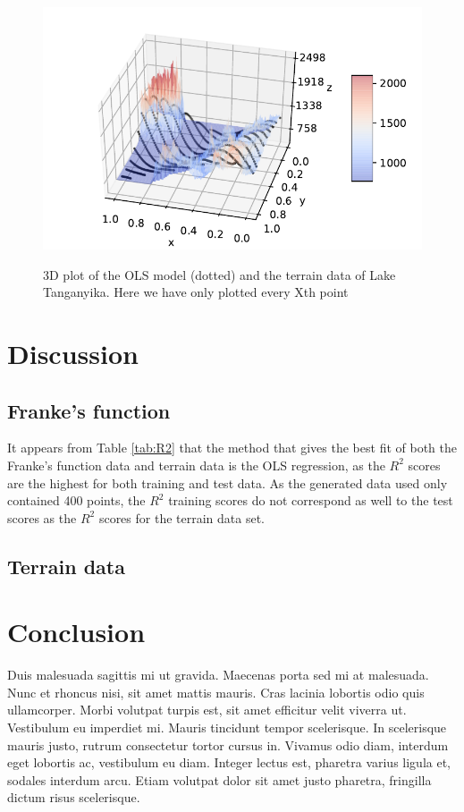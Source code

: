 \documentclass[a4paper, 10pt]{article}
\begin{document}
\begin{figure}[H]
	\includegraphics[scale=1]{figs/3dmodel_OLS_terrain.pdf}
	\label{fig:3d_OLS_terrain}
	\caption{3D plot of the OLS model (dotted) and the terrain data of Lake Tanganyika. Here we have only plotted every Xth point }
\end{figure}


\begin{multicols}{2}


\section{Discussion}
\subsection{Franke's function}
It appears from Table \ref{tab:R2} that the method that gives the best fit of both the Franke's function data and terrain data is the OLS regression, as the $R^2$ scores are the highest for both training and test data. As the generated data used only contained 400 points, the $R^2$ training scores do not correspond as well to the test scores as the $R^2$ scores for  the terrain data set. 

\subsection{Terrain data}

\section{Conclusion}
Duis malesuada sagittis mi ut gravida. Maecenas porta sed mi at malesuada. Nunc et rhoncus nisi, sit amet mattis mauris. Cras lacinia lobortis odio quis ullamcorper. Morbi volutpat turpis est, sit amet efficitur velit viverra ut. Vestibulum eu imperdiet mi. Mauris tincidunt tempor scelerisque. In scelerisque mauris justo, rutrum consectetur tortor cursus in. Vivamus odio diam, interdum eget lobortis ac, vestibulum eu diam. Integer lectus est, pharetra varius ligula et, sodales interdum arcu. Etiam volutpat dolor sit amet justo pharetra, fringilla dictum risus scelerisque.






\end{multicols}
\end{document}
